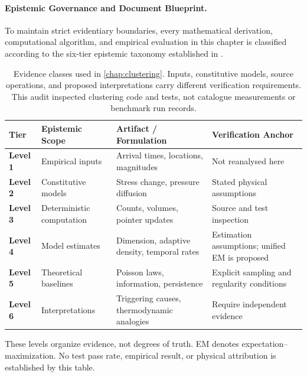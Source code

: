 \paragraph{Epistemic Governance and Document Blueprint.}
To maintain strict evidentiary boundaries, every mathematical derivation,
computational algorithm, and empirical evaluation in this chapter is classified
according to the six-tier epistemic taxonomy established in
.

\begin{table}[htbp]
  \centering
  \small
  \begin{threeparttable}
    \caption{Evidence classes used in \cref{chap:clustering}.
      Inputs, constitutive models, source operations, and proposed
      interpretations carry different verification requirements.
      This audit inspected clustering code and tests, not catalogue
    measurements or benchmark run records.}
    \label{tab:clustering_epistemic_matrix}
    \begin{tabularx}{\linewidth}{l >{\raggedright\arraybackslash}X
      >{\raggedright\arraybackslash}X >{\raggedright\arraybackslash}X}
      \toprule
      \textbf{Tier} & \textbf{Epistemic Scope} & \textbf{Artifact /
      Formulation} & \textbf{Verification Anchor} \\
      \midrule
      \textbf{Level 1} & Empirical inputs & Arrival times,
      locations, magnitudes & Not reanalysed here \\
      \textbf{Level 2} & Constitutive models & Stress change,
      pressure diffusion & Stated physical assumptions \\
      \textbf{Level 3} & Deterministic computation & Counts,
      volumes, pointer updates & Source and test inspection \\
      \textbf{Level 4} & Model estimates & Dimension, adaptive
      density, temporal rates & Estimation assumptions;
      unified EM is proposed \\
      \textbf{Level 5} & Theoretical baselines & Poisson laws,
      information, persistence & Explicit sampling and
      regularity conditions \\
      \textbf{Level 6} & Interpretations & Triggering causes,
      thermodynamic analogies & Require independent evidence \\
      \bottomrule
    \end{tabularx}
    \begin{tablenotes}[flushleft]
      \footnotesize
    \item [Analyst Classification] These levels organize evidence,
      not degrees of truth. EM denotes expectation--maximization.
      No test pass rate, empirical result, or physical attribution
      is established by this table.
    \end{tablenotes}
  \end{threeparttable}
\end{table}

